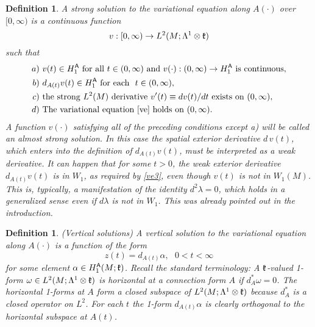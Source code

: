 \documentclass[12pt]{article}
\newtheorem{definition}[theorem]{Definition}
\def \L{\Lambda}
\def \As{\mathsf{A}}
\def \w{\omega}
\def \kf{\frak k}
\def \beq{\begin{equation}}
\def \eeq{\end{equation}}
\def \eref{\eqref}
\numberwithin{equation}{section}
\begin{document}
           \begin{definition}{\rm
A  {\it strong solution} to the variational equation along $A(\cdot)$ over $[0,\infty)$  
 is a continuous function
\beq
v:[0,\infty) \rightarrow L^2(M; \L^1\otimes \kf)      \label{ve1}
\eeq
such that 
\begin{align}
a)&\  v(t) \in H_1^{\As}    
 \ \text{for all} \ t\in(0,\infty)\ \text{and}\ v(\cdot):(0,\infty)\rightarrow H_1^\As 
                                                                                     \  \text{is continuous},      \label{ve2}\\
b)& \ d_{A(t)}v(t) \in H_1^\As 
  \  \text{for each}\ \  t\in (0,\infty),\                \label{ve3}\\
c)& \  \text{the strong $L^2(M)$ derivative $v'(t) \equiv dv(t)/dt $}\ 
\text{exists on}\ (0,\infty),   \nolinebreak  \label{ve4}    \\
d)&\ \text{The variational equation \eref{ve} holds on}\  (0,\infty).     \label{ve5}
\end{align}
A function $v(\cdot)$ satisfying all of the preceding conditions except a) will be called an
{\it almost strong solution}. In this case the spatial exterior derivative $d\,v(t)$, which enters
into the  definition of $d_{A(t)} v(t)$, 
must be interpreted  as a weak derivative.  
   It can happen that for some $t >0$, the weak exterior derivative $d_{A(t)} v(t)$
is   in $W_1$, as required by \eref{ve3}, even though $v(t)$ is not  in $W_1(M)$.
This is, typically, a manifestation of the identity
$d^2\lambda  = 0$, which holds in a generalized sense even if  $d\lambda$ is not in $W_1$.
This was already pointed out in the introduction.
}
\end{definition}

 
\begin{definition}\label{defvert}{\rm (Vertical solutions) 
  A {\it vertical solution} to the variational equation along $A(\cdot)$ is a function 
   of the form 
\beq
z(t) = d_{A(t)} \alpha, \ \ \ 0 < t <  \infty                            \label{ve8}
\eeq
for some element $\alpha \in H_1^\As(M;\kf)$.
Recall the standard terminology: A  $\kf$-valued 1- form $\w\in L^2(M;\L^1\otimes \kf)$ is 
{\it horizontal} at a connection  form $A$ if $d_A^* \w =0$. The horizontal 1-forms at $A$ form a closed subspace of $L^2(M;\L^1\otimes \kf)$ because $d_A^*$ is a closed operator on $L^2$.
For each $t$    the 1-form  $d_{A(t)}\alpha$  is clearly orthogonal to the horizontal
 subspace at $A(t)$.
}
\end{definition}
\end{document}
